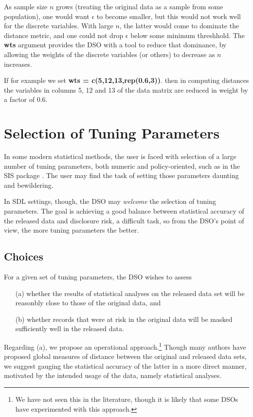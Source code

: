 \documentclass[11pt]{article}
\begin{document}
As sample size $n$ grows (treating the original data as a sample from
some population), one would want $\epsilon$ to become smaller, but this
would not work well for the discrete variables.  With large $n$, the
latter would come to dominate the distance metric, and one could not
drop $\epsilon$ below some minimum threshhold.  The {\bf wts}
argument provides the DSO with a tool to reduce that dominance, by
allowing the weights of the discrete variables (or others) to decrease
as $n$ increases.

If for example we set {\bf wts = c(5,12,13,rep(0.6,3))}. then in
computing distances the variables in columns 5, 12 and 13 of the data
matrix are reduced in weight by a factor of 0.6.  

\section{Selection of Tuning Parameters}

In some modern statistical methods, the user is faced with selection of
a large number of tuning parameters, both numeric and policy-oriented,
such as in the SIS package \cite{fan}.  The user may find the task of
setting those parameters daunting and bewildering.

In SDL settings, though, the DSO may {\it welcome} the selection of
tuning parameters. The goal is achieving a good balance between
statistical accuracy of the released data and disclosure risk, a
difficult task, so from the DSO's point of view, the more tuning
parameters the better.

\subsection{Choices}

For a given set of tuning parameters, the DSO wishes to assess

\begin{itemize}

\item [(a)] whether the results of statistical  analyses on the released
data set will be reasonbly close to those of the original data, and 

\item [(b)]
whether records that were at risk in the original data will be masked 
sufficiently well in the released data.

\end{itemize}

Regarding (a), we propose an operational approach.\footnote{We have not
seen this in the literature, though it is likely that some DSOs have
experimented with this approach.}  Though many authors have proposed
global measures of distance between the original and released data sets,
we suggest gauging the statistical accuracy of the latter in a more
direct manner, motivated by the intended usage of the data, namely
statistical analyses.
\end{document}
